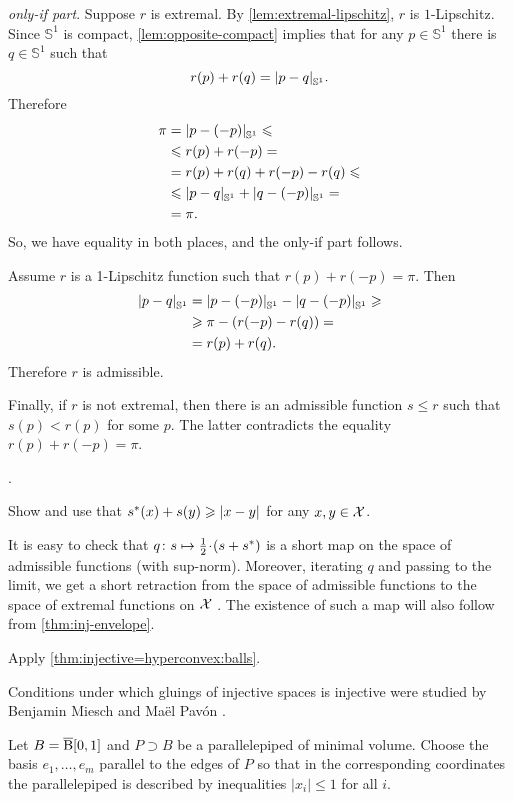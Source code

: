 \parbf{\ref{ex:circle};} \textit{only-if part}.
Suppose $r$ is extremal.
By \ref{lem:extremal-lipschitz}, $r$ is $1$-Lipschitz.
Since $\mathbb{S}^1$ is compact, \ref{lem:opposite-compact} implies that for any $p\in \mathbb{S}^1$ there is $q\in \mathbb{S}^1$ such that 
\[r(p)+r (q) = \dist{p}{q}{\mathbb{S}^1}.\]
Therefore
\begin{align*}
\pi&=\dist{p}{(-p)}{\mathbb{S}^1}\le 
\\
&\le 
r(p)+r(-p)=
\\
&=
r(p)+r(q) +r(-p) -r(q)\le
\\
&\le
\dist{p}{q}{\mathbb{S}^1}+\dist{q}{(-p)}{\mathbb{S}^1}=
\\
&=\pi.
\end{align*}
So, we have equality in both places, and the only-if part follows.

Assume $r$ is a 1-Lipschitz function such that $r(p)+r(-p)=\pi$.
Then 
\begin{align*}
\dist pq{\mathbb{S}^1}&=
\dist{p}{(-p)}{\mathbb{S}^1}-\dist{q}{(-p)}{\mathbb{S}^1}\ge
\\
&\ge\pi -(r(-p)-r(q))=
\\
&=r(p)+r(q).
\end{align*}
Therefore $r$ is admissible.

Finally, if $r$ is not extremal, then there is an admissible function $s\le r$ such that $s(p)<r(p)$ for some $p$.
The latter contradicts the equality $r(p)+r(-p)=\pi$.

 \cite[Proposition 2.7]{zuest}.

Show and use that
$s^*(x)+s(y)\ge \dist{x}{y}{}$
for any $x,y\in \mathcal{X}$.

It is easy to check that $q\:s\z\mapsto \tfrac12\cdot(s+s^*)$ is a short map on the space of admissible functions (with sup-norm).
Moreover, iterating $q$ and passing to the limit, we get a short retraction from the space of admissible functions to the space of extremal functions on $\mathcal{X}$ \cite[see 3.1 in][]{lang-2013}.
The existence of such a map will also follow from \ref{thm:inj-envelope}.

Apply \ref{thm:injective=hyperconvex:balls}.

Conditions under which gluings of injective spaces is injective were studied by Benjamin Miesch and Maël Pavón \cite{miesch,miesch-pavon}.

Let $B=\overline{\mathrm{B}}{}[0,1]$ and $P\supset B$ be a parallelepiped of minimal volume.
Choose the basis $e_1,\dots,e_m$ parallel to the edges of $P$ so that in the corresponding coordinates the parallelepiped is described by inequalities
$|x_i|\le 1$ for all $i$.

